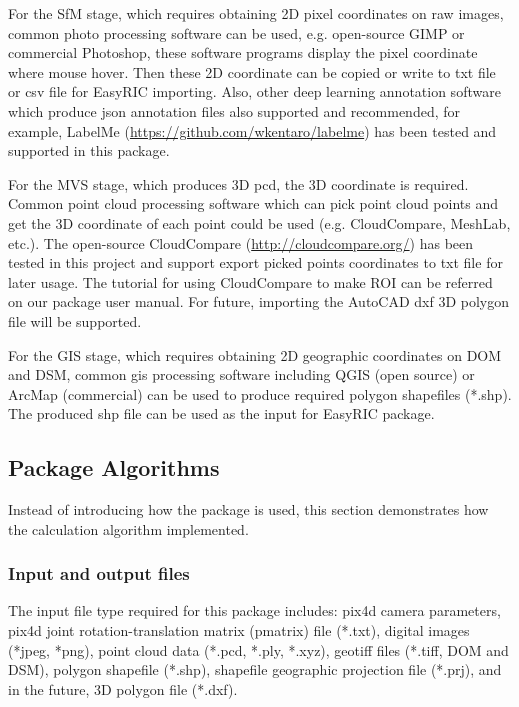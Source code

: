 \documentclass{configs/bmcart}
\begin{document}
For the SfM stage, which requires obtaining 2D pixel coordinates on raw images, common photo processing software can be used, e.g. open-source GIMP or commercial Photoshop, these software programs display the pixel coordinate where mouse hover. Then these 2D coordinate can be copied or write to txt file or csv file for EasyRIC importing. Also, other deep learning annotation software which produce json annotation files also supported and recommended, for example, LabelMe (\url{https://github.com/wkentaro/labelme}) has been tested and supported in this package.

For the MVS stage, which produces 3D \acrfull*{pcd}, the 3D coordinate is required. Common point cloud processing software which can pick point cloud points and get the 3D coordinate of each point could be used (e.g. CloudCompare, MeshLab, etc.). The open-source CloudCompare (\url{http://cloudcompare.org/}) has been tested in this project and support export picked points coordinates to txt file for later usage. The tutorial for using CloudCompare to make ROI can be referred on our package user manual. For future, importing the AutoCAD dxf 3D polygon file will be supported.

For the GIS stage, which requires obtaining 2D geographic coordinates on DOM and DSM, common \acrfull*{gis} processing software including QGIS (open source) or ArcMap (commercial) can be used to produce required polygon shapefiles (*.shp). The produced shp file can be used as the input for EasyRIC package.

\subsection*{Package Algorithms}
Instead of introducing how the package is used, this section demonstrates how the calculation algorithm implemented.

\subsubsection*{Input and output files}
The input file type required for this package includes: pix4d camera parameters, pix4d joint rotation-translation matrix (pmatrix) file (*.txt), digital images (*jpeg, *png), point cloud data (*.pcd, *.ply, *.xyz), geotiff files (*.tiff, DOM and DSM), polygon shapefile (*.shp), shapefile geographic projection file (*.prj), and in the future, 3D polygon file (*.dxf).
\end{document}
